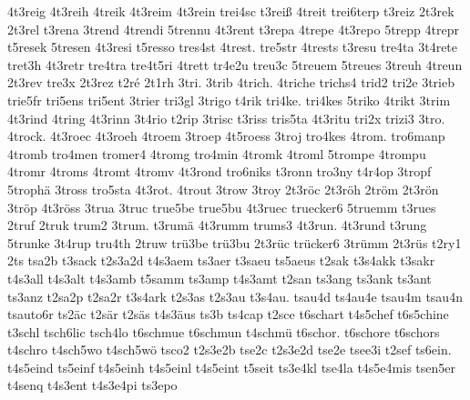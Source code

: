 {    4t3reig
    4t3reih
    4treik
    4t3reim
    4t3rein
    trei4sc
    t3reiß
    4treit
    trei6terp
    t3reiz
    2t3rek
    2t3rel
    t3rena
    3trend
    4trendi
    5trennu
    4t3rent
    t3repa
    4trepe
    4t3repo
    5trepp
    4trepr
    t5resek
    5tresen
    4t3resi
    t5resso
    tres4st
    4trest.
    tre5str
    4trests
    t3resu
    tre4ta
    3t4rete
    tret3h
    4t3retr
    tre4tra
    tre4t5ri
    4trett
    tr4e2u
    treu3c
    5treuem
    5treues
    3treuh
    4treun
    2t3rev
    tre3x
    2t3rez
    t2ré
    2t1rh
    3tri.
    3trib
    4trich.
    4triche
    trichs4
    trid2
    tri2e
    3trieb
    trie5fr
    tri5ens
    tri5ent
    3trier
    tri3gl
    3trigo
    t4rik
    tri4ke.
    tri4kes
    5triko
    4trikt
    3trim
    4t3rind
    4tring
    4t3rinn
    3t4rio
    t2rip
    3trisc
    t3riss
    tris5ta
    4t3ritu
    tri2x
    trizi3
    3tro.
    4trock.
    4t3roec
    4t3roeh
    4troem
    3troep
    4t5roess
    3troj
    tro4kes
    4trom.
    tro6manp
    4tromb
    tro4men
    tromer4
    4tromg
    tro4min
    4tromk
    4troml
    5trompe
    4trompu
    4tromr
    4troms
    4tromt
    4tromv
    4t3rond
    tro6niks
    t3ronn
    tro3ny
    t4r4op
    3tropf
    5trophä
    3tross
    tro5sta
    4t3rot.
    4trout
    3trow
    3troy
    2t3röc
    2t3röh
    2tröm
    2t3rön
    3tröp
    4t3röss
    3trua
    3truc
    true5be
    true5bu
    4t3ruec
    truecker6
    5truemm
    t3rues
    2truf
    2truk
    trum2
    3trum.
    t3rumä
    4t3rumm
    trums3
    4t3run.
    4t3rund
    t3rung
    5trunke
    3t4rup
    tru4th
    2truw
    trü3be
    trü3bu
    2t3rüc
    trücker6
    3trümm
    2t3rüs
    t2ry1
    2ts
    tsa2b
    t3sack
    t2s3a2d
    t4s3aem
    ts3aer
    t3saeu
    ts5aeus
    t2sak
    t3s4akk
    t3sakr
    t4s3all
    t4s3alt
    t4s3amb
    t5samm
    ts3amp
    t4s3amt
    t2san
    ts3ang
    ts3ank
    ts3ant
    ts3anz
    t2sa2p
    t2sa2r
    t3s4ark
    t2s3as
    t2s3au
    t3s4au.
    tsau4d
    ts4au4e
    tsau4m
    tsau4n
    tsauto6r
    ts2äc
    t2sär
    t2säs
    t4s3äus
    ts3b
    ts4cap
    t2sce
    t6schart
    t4s5chef
    t6s5chine
    t3schl
    tsch6lic
    tsch4lo
    t6schmue
    t6schmun
    t4schmü
    t6schor.
    t6schore
    t6schors
    t4schro
    t4sch5wo
    t4sch5wö
    tsco2
    t2s3e2b
    tse2c
    t2s3e2d
    tse2e
    tsee3i
    t2sef
    ts6ein.
    t4s5eind
    ts5einf
    t4s5einh
    t4s5einl
    t4s5eint
    t5seit
    ts3e4kl
    tse4la
    t4s5e4mis
    tsen5er
    t4senq
    t4s3ent
    t4s3e4pi
    ts3epo
}
